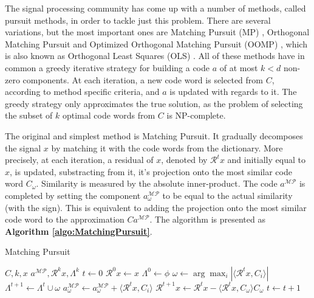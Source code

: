 \documentclass[runningheads,a4paper]{llncs}
\begin{document}
The signal processing community has come up with a number of methods, called pursuit methods, in order to tackle just this problem. There are several variations, but the most important ones are Matching Pursuit (MP) \cite{matchingpursuit1,matchingpursuit2}, Orthogonal Matching Pursuit \cite{matchingpursuit2,orthopursuit} and Optimized Orthogonal Matching Pursuit (OOMP) \cite{optimizedorthopursuit,pursuitdifferences}, which is also known as Orthogonal Least Squares (OLS) \cite{orthogonalls}. All of these methods have in common a greedy iterative strategy for building a code $a$ of at most $k < d$ non-zero components. At each iteration, a new code word is selected from $C$, according to method specific criteria, and $a$ is updated with regards to it. The greedy strategy only approximates the true solution, as the problem of selecting the subset of $k$ optimal code words from $C$ is NP-complete.

The original and simplest method is Matching Pursuit. It gradually decomposes the signal $x$ by matching it with the code words from the dictionary. More precisely, at each iteration, a residual of $x$, denoted by $\mathcal{R}^tx$ and initially equal to $x$, is updated, substracting from it, it's projection onto the most similar code word $C_\omega$. Similarity is measured by the absolute inner-product. The code $a^\mathcal{MP}$ is completed by setting the component $a_\omega^\mathcal{MP}$ to be equal to the actual similarity (with the sign). This is equivalent to adding the projection onto the most similar code word to the approximation $Ca^\mathcal{MP}$. The algorithm is presented as \textbf{Algorithm \ref{algo:MatchingPursuit}}.

\begin{algorithm}
\caption{Matching Pursuit}
\label{algo:MatchingPursuit}
\begin{algorithmic}
\Require $C,k,x$
\Ensure $a^\mathcal{MP},\mathcal{R}^kx,\Lambda^k$
\State $t \gets 0$
\State $\mathcal{R}^0x \gets x$
\State $\Lambda^0 \gets \phi$
\State $\omega \gets \arg \max_i \left| \langle \mathcal{R}^tx , C_i \rangle \right|$
\State $\Lambda^{t+1} \gets \Lambda^t \cup \omega$
\State $a_\omega^\mathcal{MP} \gets a_\omega^\mathcal{MP} + \langle \mathcal{R}^tx , C_i \rangle$
\State $\mathcal{R}^{t+1}x \gets \mathcal{R}^tx - \langle \mathcal{R}^tx , C_\omega \rangle C_\omega$
\State $t \gets t + 1$
\EndWhile
\end{algorithmic}
\end{algorithm}
\end{document}
